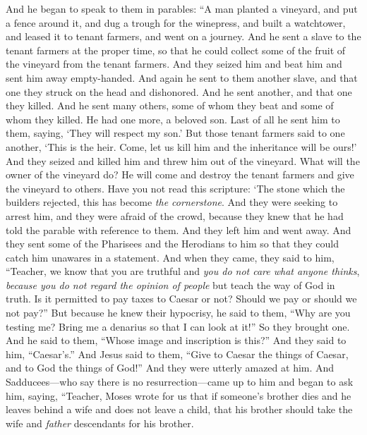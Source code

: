 \begin{biblechapter} %
 And he began to speak to them in parables: “A man planted a vineyard, and put a fence around it, and dug a trough for the winepress, and built a watchtower, and leased it to tenant farmers, and went on a journey.
\verse And he sent a slave to the tenant farmers at the proper time, so that he could collect some of the fruit of the vineyard from the tenant farmers.
\verse And they seized him and beat him and sent him away empty-handed.
\verse And again he sent to them another slave, and that one they struck on the head and dishonored.
\verse And he sent another, and that one they killed. And he sent many others, some of whom they beat and some of whom they killed.
\verse He had one more, a beloved son. Last of all he sent him to them, saying, ‘They will respect my son.’
\verse But those tenant farmers said to one another, ‘This is the heir. Come, let us kill him and the inheritance will be ours!’
\verse And they seized and killed him and threw him out of the vineyard.
\verse What will the owner of the vineyard do? He will come and destroy the tenant farmers and give the vineyard to others.
\verse Have you not read this scripture:
\verse ‘The stone which the builders rejected, 
this has become \textit{the cornerstone}.
\verse And they were seeking to arrest him, and they were afraid of the crowd, because they knew that he had told the parable with reference to them. And they left him and went away.
 And they sent some of the Pharisees and the Herodians to him so that they could catch him unawares in a statement.
\verse And when they came, they said to him, “Teacher, we know that you are truthful and \textit{you do not care what anyone thinks}, \textit{because you do not regard the opinion of people} but teach the way of God in truth. Is it permitted to pay taxes to Caesar or not? Should we pay or should we not pay?”
\verse But because he knew their hypocrisy, he said to them, “Why are you testing me? Bring me a denarius so that I can look at it!”
\verse So they brought one. And he said to them, “Whose image and inscription is this?” And they said to him, “Caesar’s.”
\verse And Jesus said to them, “Give to Caesar the things of Caesar, and to God the things of God!” And they were utterly amazed at him.
 And Sadducees—who say there is no resurrection—came up to him and began to ask him, saying,
\verse “Teacher, Moses wrote for us that if someone’s brother dies and he leaves behind a wife and does not leave a child, that his brother should take the wife and \textit{father} descendants for his brother.

\end{biblechapter}
